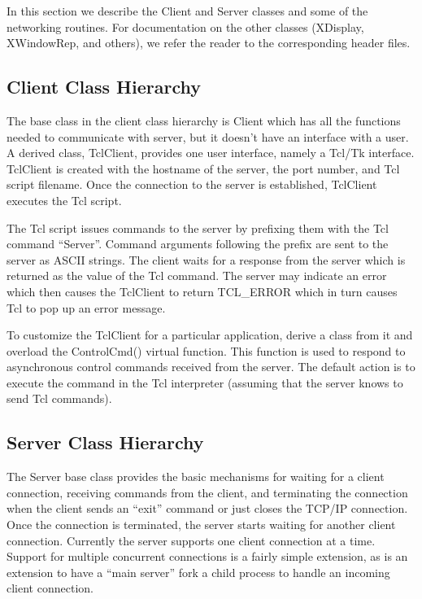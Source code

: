 In this section we describe the Client and Server classes and some of
the networking routines. For documentation on the other classes
(XDisplay, XWindowRep, and others), we refer the reader to the
corresponding header files.

\subsection{Client Class Hierarchy}

The base class in the client class hierarchy is Client which has all
the functions needed to communicate with server, but it doesn't have
an interface with a user. A derived class, TclClient, provides one
user interface, namely a Tcl/Tk interface. TclClient is created with
the hostname of the server, the port number, and Tcl script filename.
Once the connection to the server is established, TclClient executes
the Tcl script.

The Tcl script issues commands to the server by prefixing them with
the Tcl command ``Server''. Command arguments following the prefix are
sent to the server as ASCII strings. The client waits for a response
from the server which is returned as the value of the Tcl command.
The server may indicate an error which then causes the TclClient to
return TCL\_ERROR which in turn causes Tcl to pop up an error message.

To customize the TclClient for a particular application, derive a
class from it and overload the ControlCmd() virtual function. This
function is used to respond to asynchronous control commands received
from the server. The default action is to execute the command in the
Tcl interpreter (assuming that the server knows to send Tcl commands).

\subsection{Server Class Hierarchy}

The Server base class provides the basic mechanisms for waiting for a
client connection, receiving commands from the client, and terminating
the connection when the client sends an ``exit'' command or just
closes the TCP/IP connection. Once the connection is terminated, the
server starts waiting for another client connection. Currently the
server supports one client connection at a time. Support for multiple
concurrent connections is a fairly simple extension, as is an
extension to have a ``main server'' fork a child process to handle an
incoming client connection.


